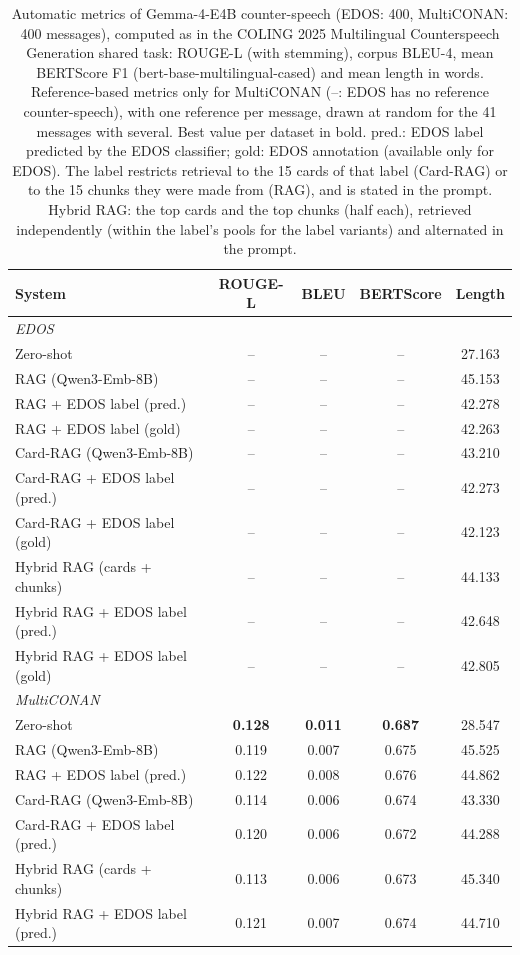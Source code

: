 \begin{table}[t]
\centering
\small
\caption{Automatic metrics of Gemma-4-E4B counter-speech (EDOS: 400, MultiCONAN: 400 messages), computed as in the COLING 2025 Multilingual Counterspeech Generation shared task: ROUGE-L (with stemming), corpus BLEU-4, mean BERTScore F1 (bert-base-multilingual-cased) and mean length in words. Reference-based metrics only for MultiCONAN (--: EDOS has no reference counter-speech), with one reference per message, drawn at random for the 41 messages with several. Best value per dataset in bold. pred.: EDOS label predicted by the EDOS classifier; gold: EDOS annotation (available only for EDOS). The label restricts retrieval to the 15 cards of that label (Card-RAG) or to the 15 chunks they were made from (RAG), and is stated in the prompt. Hybrid RAG: the top cards and the top chunks (half each), retrieved independently (within the label's pools for the label variants) and alternated in the prompt.}
\label{tab:automatic-metrics}
\begin{tabular}{lcccc}
\toprule
\textbf{System} & \textbf{ROUGE-L} & \textbf{BLEU} & \textbf{BERTScore} & \textbf{Length} \\
\midrule
\multicolumn{5}{l}{\textit{EDOS}} \\
Zero-shot & -- & -- & -- & 27.163 \\
RAG (Qwen3-Emb-8B) & -- & -- & -- & 45.153 \\
RAG + EDOS label (pred.) & -- & -- & -- & 42.278 \\
RAG + EDOS label (gold) & -- & -- & -- & 42.263 \\
Card-RAG (Qwen3-Emb-8B) & -- & -- & -- & 43.210 \\
Card-RAG + EDOS label (pred.) & -- & -- & -- & 42.273 \\
Card-RAG + EDOS label (gold) & -- & -- & -- & 42.123 \\
Hybrid RAG (cards + chunks) & -- & -- & -- & 44.133 \\
Hybrid RAG + EDOS label (pred.) & -- & -- & -- & 42.648 \\
Hybrid RAG + EDOS label (gold) & -- & -- & -- & 42.805 \\
\midrule
\multicolumn{5}{l}{\textit{MultiCONAN}} \\
Zero-shot & \textbf{0.128} & \textbf{0.011} & \textbf{0.687} & 28.547 \\
RAG (Qwen3-Emb-8B) & 0.119 & 0.007 & 0.675 & 45.525 \\
RAG + EDOS label (pred.) & 0.122 & 0.008 & 0.676 & 44.862 \\
Card-RAG (Qwen3-Emb-8B) & 0.114 & 0.006 & 0.674 & 43.330 \\
Card-RAG + EDOS label (pred.) & 0.120 & 0.006 & 0.672 & 44.288 \\
Hybrid RAG (cards + chunks) & 0.113 & 0.006 & 0.673 & 45.340 \\
Hybrid RAG + EDOS label (pred.) & 0.121 & 0.007 & 0.674 & 44.710 \\
\bottomrule
\end{tabular}
\end{table}
